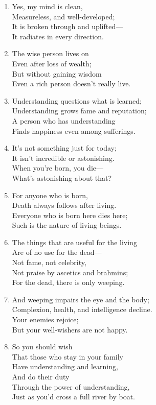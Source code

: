 \documentclass[10pt, openany]{book}
\begin{document}
\begin{enumerate}
\item Yes, my mind is clean,\\
Measureless, and well-developed;\\
It is broken through and uplifted—\\
It radiates in every direction.

\item The wise person lives on\\
Even after loss of wealth;\\
But without gaining wisdom\\
Even a rich person doesn’t really live.

\item Understanding questions what is learned;\\
Understanding grows fame and reputation;\\
A person who has understanding\\
Finds happiness even among sufferings.

\item It’s not something just for today;\\
It isn’t incredible or astonishing.\\
When you’re born, you die—\\
What’s astonishing about that?

\item For anyone who is born,\\
Death always follows after living.\\
Everyone who is born here dies here;\\
Such is the nature of living beings.

\item The things that are useful for the living\\
Are of no use for the dead—\\
Not fame, not celebrity,\\
Not praise by ascetics and brahmins;\\
For the dead, there is only weeping.

\item And weeping impairs the eye and the body;\\
Complexion, health, and intelligence decline.\\
Your enemies rejoice;\\
But your well-wishers are not happy.

\item So you should wish \\
That those who stay in your family\\
Have understanding and learning,\\
And do their duty \\
Through the power of understanding,\\
Just as you’d cross a full river by boat.


\end{enumerate}
\end{document}
